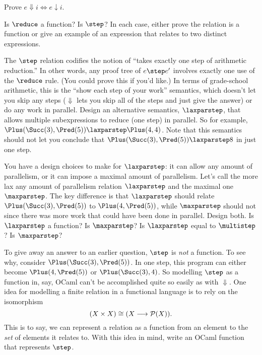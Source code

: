 
\begin{exercise}
Prove $e \Downarrow i \iff e \downarrow i$.
\end{exercise}

\begin{exercise}
Is $\reduce$ a function?  Is $\step$?  In each case, either
  prove the relation is a function or give an example of an expression
  that relates to two distinct expressions.
\end{exercise}

\begin{exercise}
The $\step$ relation codifies the notion of ``takes exactly one step
of arithmetic reduction.'' In other words, any proof tree of $e \step
e'$ involves exactly one use of the $\reduce$ rule. (You could prove
this if you'd like.)  In terms of grade-school arithmetic, this is the
``show each step of your work'' semantics, which doesn't let you skip
any steps ($\Downarrow$ lets you skip all of the steps and just give
the answer) or do any work in parallel.  Design an alternative
semantics, $\laxparstep$, that allows multiple subexpressions to
reduce (one step) in parallel.
  So for example, $\Plus(\Succ(3),\Pred(5))
  \laxparstep \Plus(4,4)$.
  Note that this semantics should not let you conclude that
  $\Plus(\Succ(3),\Pred(5)) \laxparstep 8$
  in just one step.

  You have a design choices to make for $\laxparstep$: it can allow
  any amount of parallelism, or it can impose a maximal amount of parallelism.
  Let's call the more lax any amount of parallelism relation
  $\laxparstep$ and the maximal one $\maxparstep$.  The key difference
  is that $\laxparstep$ should relate
  $\Plus(\Succ(3),\Pred(5))$ to
  $\Plus(4,\Pred(5))$, while $\maxparstep$ should not
  since there was more work that could have been done in parallel.
  Design both.  Is $\laxparstep$ a function?  Is $\maxparstep$?
  Is $\laxparstep$ equal to $\multistep$?  Is $\maxparstep$?
\end{exercise}

\begin{exercise}
To give away an answer to an earlier question, $\step$ is \emph{not} a
function.  To see why, consider $\Plus(\Succ(3),\Pred(5))$.  In one
step, this program can either become $\Plus(4,\Pred(5))$ or
$\Plus(\Succ(3),4)$.  So modelling $\step$ as a function in, say,
OCaml can't be accomplished quite so easily as with $\Downarrow$.  One
idea for modelling a finite relation in a functional language is to
rely on the isomorphism
\[
(X \times X) \cong (X \longrightarrow \mathcal{P}(X))\text.
\]
This is to say, we can represent a relation as a function from
an element to the \emph{set} of elements it relates to.
%
With this idea in mind, write an OCaml function  that
represents $\step$.
\end{exercise}

